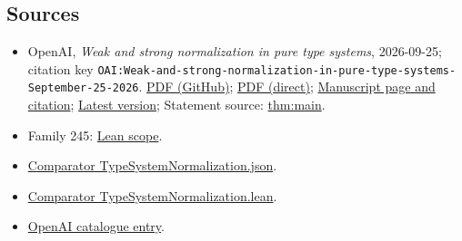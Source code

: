 \documentclass[11pt]{article}
\begin{document}
\subsection{Sources}
\begin{itemize}
\item OpenAI, \emph{Weak and strong normalization in pure type systems}, 2026-09-25; citation key \texttt{OAI:Weak-and-strong-normalization-in-pure-type-systems-September-25-2026}. \href{https://github.com/openai/math/blob/adc7f1241b42e322a6451854ab7e4b4c146bf78a/preprints/Weak-and-strong-normalization-in-pure-type-systems-September-25-2026/paper.pdf}{PDF (GitHub)}; \href{https://github.com/openai/math/raw/adc7f1241b42e322a6451854ab7e4b4c146bf78a/preprints/Weak-and-strong-normalization-in-pure-type-systems-September-25-2026/paper.pdf}{PDF (direct)}; \href{https://github.com/openai/math/blob/adc7f1241b42e322a6451854ab7e4b4c146bf78a/preprints/Weak-and-strong-normalization-in-pure-type-systems-September-25-2026/README.md}{Manuscript page and citation}; \href{https://github.com/openai/math/blob/main/preprints/Weak-and-strong-normalization-in-pure-type-systems-September-25-2026/paper.pdf}{Latest version}; Statement source: \href{https://github.com/openai/math/blob/adc7f1241b42e322a6451854ab7e4b4c146bf78a/preprints/Weak-and-strong-normalization-in-pure-type-systems-September-25-2026/build/sections/introduction.tex\#L116}{thm:main}.
\item Family 245: \href{https://github.com/openai/math/blob/adc7f1241b42e322a6451854ab7e4b4c146bf78a/lean/docs/245.md}{Lean scope}.
\item \href{https://github.com/openai/math/blob/adc7f1241b42e322a6451854ab7e4b4c146bf78a/lean/ComparatorChallenges/TypeSystemNormalization.json}{Comparator TypeSystemNormalization.json}.
\item \href{https://github.com/openai/math/blob/adc7f1241b42e322a6451854ab7e4b4c146bf78a/lean/ComparatorChallenges/TypeSystemNormalization.lean}{Comparator TypeSystemNormalization.lean}.
\item \href{https://github.com/openai/math/blob/adc7f1241b42e322a6451854ab7e4b4c146bf78a/CONTENTS.md}{OpenAI catalogue entry}.
\end{itemize}
\end{document}
